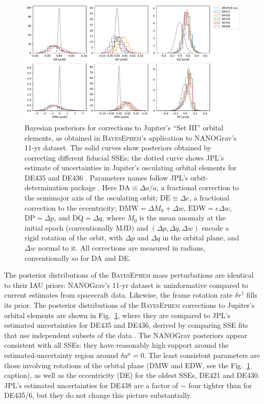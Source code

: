 \documentclass[iop,apj,twocolappendix]{emulateapj}
\begin{document}
%
\begin{figure}[t]
    \includegraphics[width=2\columnwidth]{figures/setIII-posteriors.pdf}
    \caption{Bayesian posteriors for corrections to Jupiter's ``Set III'' orbital elements, as obtained in \textsc{BayesEphem}'s application to NANOGrav's 11-yr dataset. The solid curves show posteriors obtained by correcting different fiducial SSEs; the dotted curve shows JPL's estimate of uncertainties in Jupiter's osculating orbital elements for DE435 and DE436 \citep{de434}.
    Parameters names follow JPL's orbit-determination package \citep{moyer2003}. %
    Here $\mathrm{DA} \equiv \Delta a/a$, a fractional correction to the semimajor axis of the osculating orbit; $\mathrm{DE} \equiv \Delta e$, a fractional correction to the eccentricity; $\mathrm{DMW} = \Delta M_0 + \Delta w$, $\mathrm{EDW} = e \Delta w$, $\mathrm{DP} = \Delta p$, and $\mathrm{DQ} = \Delta q$, where $M_0$ is the mean anomaly at the initial epoch (conventionally MJD) and $(\Delta p, \Delta q, \Delta w)$ encode a rigid rotation of the orbit, with $\Delta p$ and $\Delta q$ in the orbital plane, and $\Delta w$ normal to it. All corrections are measured in radians, conventionally so for DA and DE.}
    \label{fig:setIIIposteriors}
\end{figure}

The posterior distributions of the \textsc{BayesEphem} mass perturbations are identical to their IAU priors:  NANOGrav's 11-yr dataset is uninformative compared to current estimates from spacecraft data. Likewise, the frame rotation rate $\delta r^{\hat{z}}$ fills its prior.
The posterior distributions of the \textsc{BayesEphem} corrections to Jupiter's orbital elements are shown in Fig.\ \ref{fig:setIIIposteriors}, where they are compared to JPL's estimated uncertainties for DE435 and DE436, derived by comparing SSE fits that use independent subsets of the data \citep{de434}. The NANOGrav posteriors appear consistent with all SSEs: they have reasonably high support around the estimated-uncertainty region around $\delta a^\mu = 0$. The least consistent parameters are those involving rotations of the orbital plane (DMW and EDW, see the Fig.\ \ref{fig:setIIIposteriors} caption), as well as the eccentricity (DE) for the oldest SSEs, DE421 and DE430. JPL's estimated uncertainties for DE438 are a factor of $\sim$ four tighter than for DE435/6, but they do not change this picture substantially.
\end{document}
